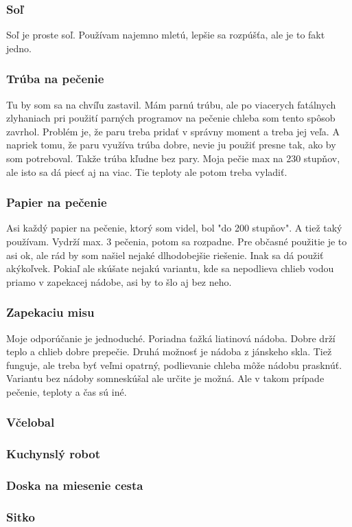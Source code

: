 \documentclass[a4paper,12pt]{article}
\begin{document}
\subsubsection{Soľ}
Soľ je proste soľ. Používam najemno mletú, lepšie sa rozpúšťa, ale je to fakt jedno.
\subsubsection{Trúba na pečenie}
Tu by som sa na chvíľu zastavil. Mám parnú trúbu, ale po viacerych fatálnych zlyhaniach pri použití parných programov na pečenie chleba som tento spôsob zavrhol. Problém je, že paru treba pridať v správny moment a treba jej veľa. A napriek tomu, že paru využíva trúba dobre, nevie ju použiť presne tak, ako by som potreboval. Takže trúba kľudne bez pary. Moja pečie max na 230 stupňov, ale isto sa dá piecť aj na viac. Tie teploty ale potom treba vyladiť.
\subsubsection{Papier na pečenie}
Asi každý papier na pečenie, ktorý som videl, bol "do 200 stupňov". A tiež taký používam. Vydrží max. 3 pečenia, potom sa rozpadne. Pre občasné použitie je to asi ok, ale rád by som našiel nejaké dlhodobejšie riešenie. Inak sa dá použiť akýkoľvek. Pokiaľ ale skúšate nejakú variantu, kde sa nepodlieva chlieb vodou priamo v zapekacej nádobe, asi by to šlo aj bez neho.
\subsubsection{Zapekaciu misu}
Moje odporúčanie je jednoduché. Poriadna ťažká liatinová nádoba. Dobre drží teplo a chlieb dobre prepečie. Druhá možnosť je nádoba z jánskeho skla. Tiež funguje, ale treba byť veľmi opatrný, podlievanie chleba môže nádobu prasknúť. Variantu bez nádoby somneskúšal ale určite je možná. Ale v takom prípade pečenie, teploty a čas sú iné.
\subsubsection{Včelobal}
\subsubsection{Kuchynslý robot}
\subsubsection{Doska na miesenie cesta}
\subsubsection{Sitko}
\end{document}
